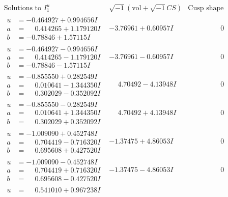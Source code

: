 \documentclass[1p]{elsarticle_modified}
\theoremstyle{definition}
\newcommand{\I}{\sqrt{-1}}
\begin{document}
$$\begin{array}{c|c|c}
\text{Solutions to }I^u_{1}& \I (\text{vol} + \sqrt{-1}CS) & \text{Cusp shape}\\
 \hline 
\begin{aligned}
u &= -0.464927 + 0.994656 I \\
a &= \phantom{-}0.414265 + 1.179120 I \\
b &= -0.78846 + 1.57115 I\end{aligned}
 & -3.76961 + 0.60957 I & \phantom{-0.000000 } 0 \\ \hline\begin{aligned}
u &= -0.464927 - 0.994656 I \\
a &= \phantom{-}0.414265 - 1.179120 I \\
b &= -0.78846 - 1.57115 I\end{aligned}
 & -3.76961 - 0.60957 I & \phantom{-0.000000 } 0 \\ \hline\begin{aligned}
u &= -0.855550 + 0.282549 I \\
a &= \phantom{-}0.010641 - 1.344350 I \\
b &= \phantom{-}0.302029 - 0.352092 I\end{aligned}
 & \phantom{-}4.70492 - 4.13948 I & \phantom{-0.000000 } 0 \\ \hline\begin{aligned}
u &= -0.855550 - 0.282549 I \\
a &= \phantom{-}0.010641 + 1.344350 I \\
b &= \phantom{-}0.302029 + 0.352092 I\end{aligned}
 & \phantom{-}4.70492 + 4.13948 I & \phantom{-0.000000 } 0 \\ \hline\begin{aligned}
u &= -1.009090 + 0.452748 I \\
a &= \phantom{-}0.704419 - 0.716320 I \\
b &= \phantom{-}0.695608 + 0.427520 I\end{aligned}
 & -1.37475 + 4.86053 I & \phantom{-0.000000 } 0 \\ \hline\begin{aligned}
u &= -1.009090 - 0.452748 I \\
a &= \phantom{-}0.704419 + 0.716320 I \\
b &= \phantom{-}0.695608 - 0.427520 I\end{aligned}
 & -1.37475 - 4.86053 I & \phantom{-0.000000 } 0 \\ \hline\begin{aligned}
u &= \phantom{-}0.541010 + 0.967238 I \\

\end{aligned}
\end{array}$$
\end{document}
